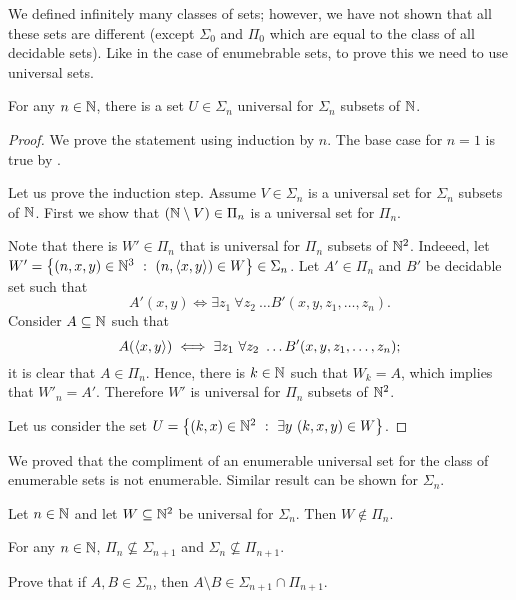 We defined infinitely many classes of sets; however, we have not shown that all
these sets are different (except $\Sigma_0$ and $\Pi_0$ which are equal to the
class of all decidable sets). Like in the case of enumebrable sets, to prove
this we need to use universal sets.
\begin{theorem}
  For any $n \in {\mathbb{N}}$, there is a set $U \in \Sigma_n$ universal for $\Sigma_n$
  subsets of ${\mathbb{N}}$.
\end{theorem}
\begin{proof}
  We prove the statement using induction by $n$. The base case for $n = 1$ is
  true by
  .

  Let us prove the induction step. Assume $V \in \Sigma_n$ is a universal set
  for $\Sigma_n$ subsets of ${\mathbb{N}}$. First we show that $({\mathbb{N}} \setminus V) \in \Pi_n$
  is a universal set for $\Pi_n$.
  
  
  Note that there is $W' \in \Pi_n$ that is universal for $\Pi_n$ subsets
  of ${\mathbb{N}}^2$. Indeeed, let $W' = \set[(n, \pair{x}{y}) \in W]{(n, x, y) \in \N^3}
  \in \Sigma_n$.
  Let $A' \in \Pi_n$ and $B'$ be decidable set such that
  \[
    A'(x, y) \iff \exists z_1 \  \forall z_2 \  \dots B'(x, y, z_1, \dots, z_n).
  \]
  Consider $A \subseteq {\mathbb{N}}$ such that 
  \[
    A(\langle {x}, {y} \rangle) \iff \exists z_1 \  \forall z_2 \  \dots 
      B'(x, y, z_1, \dots, z_n);
  \]
  it is clear that $A \in \Pi_n$. Hence, there is $k \in {\mathbb{N}}$ such that 
  $W_k = A$, which implies that $W'_n = A'$. Therefore $W'$ is universal for
  $\Pi_n$ subsets of ${\mathbb{N}}^2$.

  Let us consider the set 
  $U = \set[\exists y \  (k, x, y) \in W]{(k, x) \in \N^2}$.
\end{proof}

We proved that the compliment of an enumerable universal set for the class of
enumerable sets is not enumerable. Similar result can be shown for $\Sigma_n$.
\begin{theorem}
  Let $n \in {\mathbb{N}}$ and let $W \subseteq {\mathbb{N}}^2$ be universal for $\Sigma_n$. Then 
  $W \not\in \Pi_n$.
\end{theorem}

\begin{corollary}
  For any $n \in {\mathbb{N}}$, $\Pi_n \not\subseteq \Sigma_{n + 1}$ and 
  $\Sigma_n \not\subseteq \Pi_{n + 1}$.
\end{corollary}

\begin{chapterendexercises}
  \exercise Prove that if $A, B \in \Sigma_n$, then 
    $A \setminus B \in \Sigma_{n + 1} \cap \Pi_{n + 1}$.
\end{chapterendexercises}
